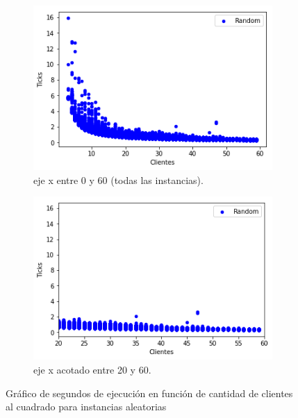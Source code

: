 \documentclass[A4paper,oneside,fleqn,11pt]{article}
\theoremstyle{definition}
\begin{document}


\begin{figure}[H] %
    \begin{subfigure}[b]{0.45\textwidth}
        \includegraphics[width=\textwidth]{wasdcomplejidad1.png}
        \caption[center]{eje x entre 0 y 60 (todas las instancias).}
        \label{ni se pa que sirve esto}
    \end{subfigure}
    \begin{subfigure}[b]{0.45\textwidth}
        \includegraphics[width=\textwidth]{zoom1p3.png}
        \caption{eje x acotado entre 20 y 60.}
        \label{ni se pa que sirve esto}
    \end{subfigure}
    \caption{Gráfico de segundos de ejecución en función de cantidad de clientes al cuadrado para instancias aleatorias}
\end{figure}
\end{document}
